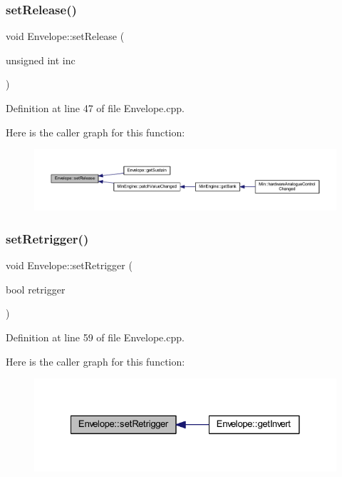 \subsubsection{\texorpdfstring{set\+Release()}{setRelease()}}
{\footnotesize\ttfamily void Envelope\+::set\+Release (\begin{DoxyParamCaption}\item[{unsigned int}]{inc }\end{DoxyParamCaption})}



Definition at line 47 of file Envelope.\+cpp.

Here is the caller graph for this function\+:
\nopagebreak
\begin{figure}[H]
\begin{center}
\leavevmode
\includegraphics[width=350pt]{class_envelope_a7102e88984b79766c6e9dc4a3c7e278d_icgraph}
\end{center}
\end{figure}
\mbox{\label{class_envelope_a88691c37c715df009f27de4ff156679f}} 
\subsubsection{\texorpdfstring{set\+Retrigger()}{setRetrigger()}}
{\footnotesize\ttfamily void Envelope\+::set\+Retrigger (\begin{DoxyParamCaption}\item[{bool}]{retrigger }\end{DoxyParamCaption})}



Definition at line 59 of file Envelope.\+cpp.

Here is the caller graph for this function\+:
\nopagebreak
\begin{figure}[H]
\begin{center}
\leavevmode
\includegraphics[width=328pt]{class_envelope_a88691c37c715df009f27de4ff156679f_icgraph}
\end{center}
\end{figure}
\mbox{\label{class_envelope_adb5198f773dffea346cbfda055556e69}} 
